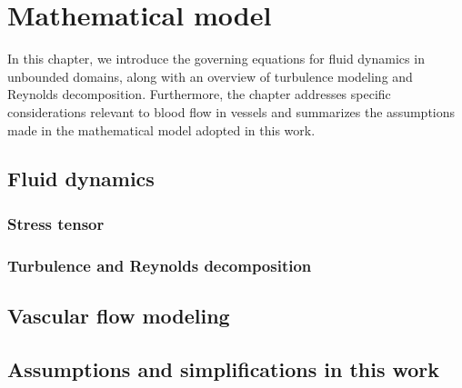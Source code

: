 \chapter{Mathematical model}
In this chapter, we introduce the governing equations for fluid  dynamics in unbounded domains, along with an overview of turbulence modeling and Reynolds decomposition. Furthermore, the chapter addresses specific considerations relevant to blood flow in vessels and summarizes the assumptions made in the mathematical model adopted in this work.

\section{Fluid dynamics}


\subsection{Stress tensor}


\subsection{Turbulence and Reynolds decomposition}\label{turb}


\section{Vascular flow modeling}\label{cevni proudeni}


\section{Assumptions and simplifications in this work}\label{pred}
